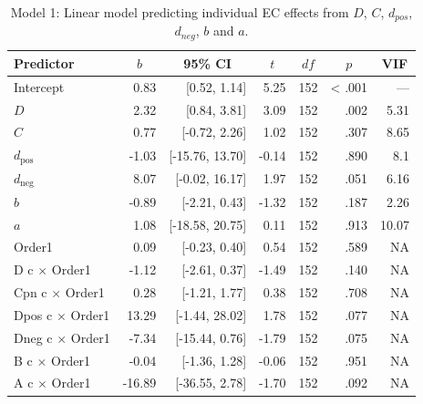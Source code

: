 \documentclass[
  man,floatsintext]{apa6}
\begin{document}
\begin{table}[tbp]

\begin{center}
\begin{threeparttable}

\caption{\label{tab:unnamed-chunk-19}Model 1: Linear model predicting individual EC effects from $D$, $C$, $d_{pos}$, $d_{neg}$, $b$ and $a$.}

\begin{tabular}{lrrrrrr}
\toprule
Predictor & \multicolumn{1}{c}{$b$} & \multicolumn{1}{c}{95\% CI} & \multicolumn{1}{c}{$t$} & \multicolumn{1}{c}{$\mathit{df}$} & \multicolumn{1}{c}{$p$} & \multicolumn{1}{c}{VIF}\\
\midrule
Intercept & 0.83 & {}[0.52, 1.14] & 5.25 & 152 & < .001 & ---\\
$D$ & 2.32 & {}[0.84, 3.81] & 3.09 & 152 & .002 & 5.31\\
$C$ & 0.77 & {}[-0.72, 2.26] & 1.02 & 152 & .307 & 8.65\\
$d_{\mathrm{pos}}$ & -1.03 & {}[-15.76, 13.70] & -0.14 & 152 & .890 & 8.1\\
$d_{\mathrm{neg}}$ & 8.07 & {}[-0.02, 16.17] & 1.97 & 152 & .051 & 6.16\\
$b$ & -0.89 & {}[-2.21, 0.43] & -1.32 & 152 & .187 & 2.26\\
$a$ & 1.08 & {}[-18.58, 20.75] & 0.11 & 152 & .913 & 10.07\\
Order1 & 0.09 & {}[-0.23, 0.40] & 0.54 & 152 & .589 & NA\\
D c $\times$ Order1 & -1.12 & {}[-2.61, 0.37] & -1.49 & 152 & .140 & NA\\
Cpn c $\times$ Order1 & 0.28 & {}[-1.21, 1.77] & 0.38 & 152 & .708 & NA\\
Dpos c $\times$ Order1 & 13.29 & {}[-1.44, 28.02] & 1.78 & 152 & .077 & NA\\
Dneg c $\times$ Order1 & -7.34 & {}[-15.44, 0.76] & -1.79 & 152 & .075 & NA\\
B c $\times$ Order1 & -0.04 & {}[-1.36, 1.28] & -0.06 & 152 & .951 & NA\\
A c $\times$ Order1 & -16.89 & {}[-36.55, 2.78] & -1.70 & 152 & .092 & NA\\
\bottomrule
\end{tabular}

\end{threeparttable}
\end{center}

\end{table}
\end{document}
